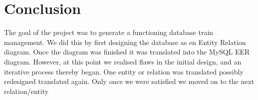 \section{Conclusion}


The goal of the project was to generate a functioning database train 
management. We did this by first designing the database as en Entity Relation 
diagram. Once the diagram was finished it was translated into the MySQL EER 
diagram. However, at this point we realised flaws in the initial design, and an 
iterative process thereby began. One entity or relation was translated possibly 
redesigned translated again. Only once we were satisfied we moved on to the 
next relation/entity
